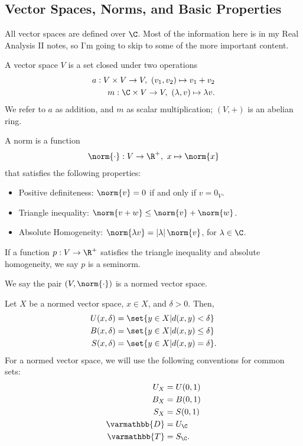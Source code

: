 \documentclass[10pt]{mypackage}
\renewcommand*{\mathbb}[1]{\varmathbb{#1}}
\begin{document}
\subsection{Vector Spaces, Norms, and Basic Properties}%
All vector spaces are defined over $\C$. Most of the information here is in my Real Analysis II notes, so I'm going to skip to some of the more important content.
\begin{definition}
  A vector space $V$ is a set closed under two operations
  \begin{align*}
    a: V\times V \rightarrow V,~\left(v_1,v_2\right)\mapsto v_1 + v_2\\
    m: \C\times V\rightarrow V,~\left(\lambda,v\right) \mapsto \lambda v.
  \end{align*}
  We refer to $a$ as addition, and $m$ as scalar multiplication; $(V,+)$ is an abelian ring.
\end{definition}
\begin{definition}[Norm]
  A norm is a function
  \begin{align*}
    \norm{\cdot}: V \rightarrow \R^+,~x\mapsto \norm{x}
  \end{align*}
  that satisfies the following properties:
  \begin{itemize}
    \item Positive definiteness: $\norm{v} = 0$ if and only if $v = 0_V$.
    \item Triangle inequality: $\norm{v+w} \leq \norm{v} + \norm{w}$.
    \item Absolute Homogeneity: $\norm{\lambda v} = \left\vert \lambda \right\vert\norm{v}$, for $\lambda \in \C$.
  \end{itemize}
  If a function $p: V\rightarrow \R^+$ satisfies the triangle inequality and absolute homogeneity, we say $p$ is a seminorm.
\end{definition}
We say the pair $\left(V,\norm{\cdot}\right)$ is a normed vector space.
\begin{definition}
  Let $X$ be a normed vector space, $x\in X$, and $\delta > 0$. Then,
  \begin{align*}
    U(x,\delta) &= \set{y\in X| d(x,y) < \delta}\\
    B(x,\delta) &= \set{y\in X| d(x,y) \leq \delta}\\
    S(x,\delta) &= \set{y\in X| d(x,y) = \delta}.
  \end{align*}
  For a normed vector space, we will use the following conventions for common sets:
  \begin{align*}
    U_X &= U(0,1)\\
    B_X &= B(0,1)\\
    S_X &= S(0,1)\\
    \mathbb{D} &= U_{\C}\\
    \mathbb{T} &= S_{\C}.
  \end{align*}
\end{definition}
\end{document}
